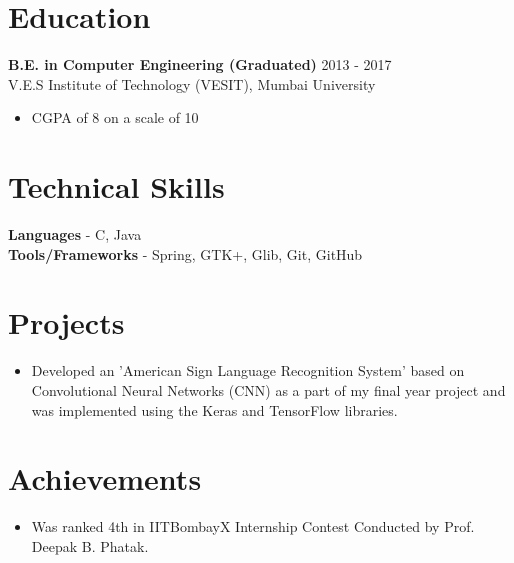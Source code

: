 \documentclass[12pt,margin, centered]{res}
\begin{document}
\begin{resume}
\section{Education}
\vspace{10mm}
\textbf{B.E. in Computer Engineering (Graduated)} \hfill 2013 - 2017 \\
V.E.S Institute of Technology (VESIT), Mumbai University
\begin{itemize}
 \item CGPA of 8 on a scale of 10
\end{itemize}

\section{Technical \hspace{2mm} Skills}
\vspace{10mm}
\textbf{Languages} - C, Java \\
\textbf{Tools/Frameworks} - Spring, GTK+, Glib, Git, GitHub

\section{Projects}
\vspace{10mm}
\begin{itemize}[leftmargin=*]
 \item Developed an 'American Sign Language Recognition System' based on Convolutional Neural Networks (CNN) as a part of my final year project and was implemented using the Keras and TensorFlow libraries.
\end{itemize}


\section{Achievements}
\vspace{12mm}
\begin{itemize}[leftmargin=*]
\item Was ranked 4th in IITBombayX Internship Contest Conducted by Prof. Deepak B. Phatak.
\end{itemize}


\end{resume}
\end{document}
